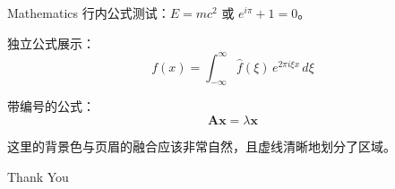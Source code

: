 \documentclass[aspectratio=169]{beamer}
\begin{document}
\begin{frame}{Mathematics}
    行内公式测试：$E = mc^2$ 或 $e^{i\pi} + 1 = 0$。
    
    独立公式展示：
    \[
        f(x) = \int_{-\infty}^{\infty} \hat{f}(\xi)\,e^{2\pi i \xi x} \,d\xi
    \]
    
    带编号的公式：
    \begin{equation}
        \mathbf{A} \mathbf{x} = \lambda \mathbf{x}
    \end{equation}
    
    这里的背景色与页眉的融合应该非常自然，且虚线清晰地划分了区域。
\end{frame}

\begin{frame}[standout]
    Thank You
\end{frame}
\end{document}
